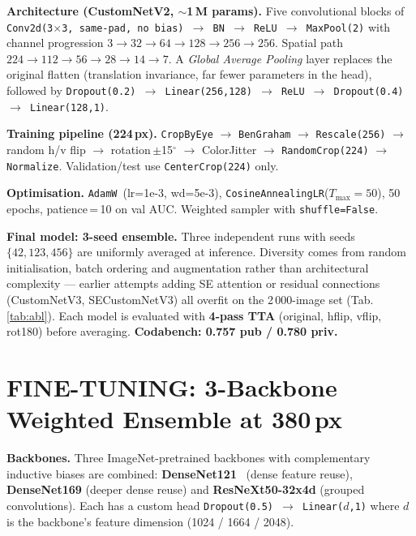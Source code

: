\documentclass[a4paper, 10pt, twocolumn]{article}
\begin{document}
\textbf{Architecture (CustomNetV2, $\sim$1\,M params).}
Five convolutional blocks of \texttt{Conv2d(3$\times$3, same-pad, no bias)
$\to$ BN $\to$ ReLU $\to$ MaxPool(2)} with channel progression
$3{\to}32{\to}64{\to}128{\to}256{\to}256$. Spatial path
$224{\to}112{\to}56{\to}28{\to}14{\to}7$. A \emph{Global Average Pooling}
layer replaces the original flatten (translation invariance, far fewer
parameters in the head), followed by
\texttt{Dropout(0.2) $\to$ Linear(256,128) $\to$ ReLU $\to$ Dropout(0.4)
$\to$ Linear(128,1)}.

\textbf{Training pipeline (224\,px).}
\texttt{CropByEye} $\to$ \texttt{BenGraham} $\to$ \texttt{Rescale(256)}
$\to$ random h/v flip $\to$ rotation\,$\pm$15$^\circ$ $\to$ ColorJitter
$\to$ \texttt{RandomCrop(224)} $\to$ \texttt{Normalize}. Validation/test
use \texttt{CenterCrop(224)} only.

\textbf{Optimisation.} \texttt{AdamW}~(lr=1e-3, wd=5e-3),
\texttt{CosineAnnealingLR}($T_{\max}{=}50$), 50 epochs, patience\,=\,10
on val AUC. Weighted sampler with \texttt{shuffle=False}.

\textbf{Final model: 3-seed ensemble.} Three independent runs with seeds
$\{42, 123, 456\}$ are uniformly averaged at inference. Diversity comes
from random initialisation, batch ordering and augmentation rather than
architectural complexity --- earlier attempts adding SE attention or
residual connections (CustomNetV3, SECustomNetV3) all overfit on the
2\,000-image set (Tab.\,\ref{tab:abl}). Each model is evaluated with
\textbf{4-pass TTA} (original, hflip, vflip, rot180) before averaging.
\textbf{Codabench: 0.757 pub / 0.780 priv.}

\section{FINE-TUNING: 3-Backbone Weighted Ensemble at 380\,px}

\textbf{Backbones.} Three ImageNet-pretrained backbones with complementary
inductive biases are combined: \textbf{DenseNet121}~\cite{huang2017densely}
(dense feature reuse), \textbf{DenseNet169} (deeper dense reuse) and
\textbf{ResNeXt50-32x4d} (grouped convolutions). Each has a custom head
\texttt{Dropout(0.5) $\to$ Linear($d$,1)} where $d$ is the backbone's
feature dimension (1024 / 1664 / 2048).
\end{document}
